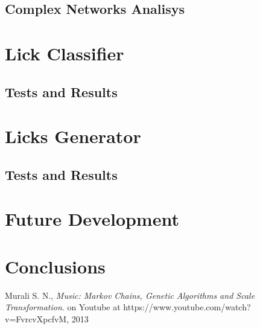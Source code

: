 \documentclass[a4paper,10pt]{paper}
\begin{document}
\subsection{Complex Networks Analisys}

\section{Lick Classifier}
\subsection{Tests and Results}

\section{Licks Generator}
\subsection{Tests and Results}

\section{Future Development}

\section{Conclusions}

\begin{thebibliography}{50}
   Murali S. N., \textsl{Music: Markov Chains, Genetic Algorithms and Scale Transformation}.
		on Youtube at https://www.youtube.com/watch?v=FvrcvXpcfvM, 2013
\end{thebibliography}
\end{document}
